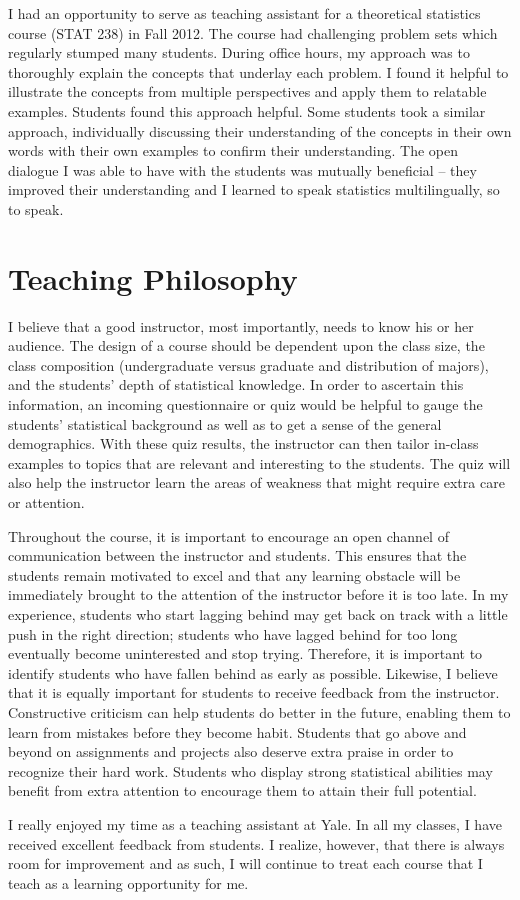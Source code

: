 \documentclass[11pt]{article}
\begin{document}
I had an opportunity to serve as teaching assistant for a theoretical statistics course (STAT 238) in Fall 2012. The course had challenging problem sets which regularly stumped many students. During office hours, my approach was to thoroughly explain the concepts that underlay each problem. I found it helpful to illustrate the concepts from multiple perspectives and apply them to relatable examples. Students found this approach helpful. Some students took a similar approach, individually discussing their understanding of the concepts in their own words with their own examples to confirm their understanding. The open dialogue I was able to have with the students was mutually beneficial -- they improved their understanding and I learned to speak statistics multilingually, so to speak.

\section{Teaching Philosophy} %
\label{sec:teaching_philosophy}
I believe that a good instructor, most importantly, needs to know his or her audience. The design of a course should be dependent upon the class size, the class composition (undergraduate versus graduate and distribution of majors), and the students' depth of statistical knowledge. In order to ascertain this information, an incoming questionnaire or quiz would be helpful to gauge the students' statistical background as well as to get a sense of the general demographics. With these quiz results, the instructor can then tailor in-class examples to topics that are relevant and interesting to the students. The quiz will also help the instructor learn the areas of weakness that might require  extra care or attention.

Throughout the course, it is important to encourage an open channel of communication between the instructor and students. This ensures that the students remain motivated to excel and that any learning obstacle will be immediately brought to the attention of the instructor before it is too late. In my experience, students who start lagging behind may get back on track with
a little push in the right direction; students who have lagged behind for too long eventually become uninterested and stop trying. Therefore, it is important to identify students who have fallen behind as early as possible. Likewise, I believe that it is equally important for students to receive feedback from the instructor. Constructive criticism can help students do better in the future, enabling them to learn from mistakes before they become habit. Students that go above and beyond on assignments and projects also deserve extra praise in order to recognize their hard work. Students who display strong statistical abilities may benefit from extra attention to encourage them to attain their full potential.

I really enjoyed my time as a teaching assistant at Yale. In all my classes, I have received excellent feedback from students. I realize, however, that there is always room for improvement and as such, I will continue to treat each course that I teach as a learning opportunity for me.  
\end{document}
